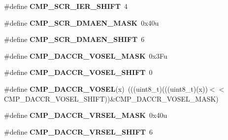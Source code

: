 \begin{DoxyCompactItemize}
\item 
\#define {\bfseries C\+M\+P\+\_\+\+S\+C\+R\+\_\+\+I\+E\+R\+\_\+\+S\+H\+I\+FT}~4\hypertarget{group__CMP__Register__Masks_ga24fc92779af70d4d7fc87102c53b86ca}{}\label{group__CMP__Register__Masks_ga24fc92779af70d4d7fc87102c53b86ca}

\item 
\#define {\bfseries C\+M\+P\+\_\+\+S\+C\+R\+\_\+\+D\+M\+A\+E\+N\+\_\+\+M\+A\+SK}~0x40u\hypertarget{group__CMP__Register__Masks_ga217e649d3512ff1bba2c22885d768148}{}\label{group__CMP__Register__Masks_ga217e649d3512ff1bba2c22885d768148}

\item 
\#define {\bfseries C\+M\+P\+\_\+\+S\+C\+R\+\_\+\+D\+M\+A\+E\+N\+\_\+\+S\+H\+I\+FT}~6\hypertarget{group__CMP__Register__Masks_gafafda406631ad26c72187f4df02df484}{}\label{group__CMP__Register__Masks_gafafda406631ad26c72187f4df02df484}

\item 
\#define {\bfseries C\+M\+P\+\_\+\+D\+A\+C\+C\+R\+\_\+\+V\+O\+S\+E\+L\+\_\+\+M\+A\+SK}~0x3\+Fu\hypertarget{group__CMP__Register__Masks_gaf785bdf33cec5e0e8d03022bd7d92022}{}\label{group__CMP__Register__Masks_gaf785bdf33cec5e0e8d03022bd7d92022}

\item 
\#define {\bfseries C\+M\+P\+\_\+\+D\+A\+C\+C\+R\+\_\+\+V\+O\+S\+E\+L\+\_\+\+S\+H\+I\+FT}~0\hypertarget{group__CMP__Register__Masks_ga329adee42ffc5125d3a6a85c6b990311}{}\label{group__CMP__Register__Masks_ga329adee42ffc5125d3a6a85c6b990311}

\item 
\#define {\bfseries C\+M\+P\+\_\+\+D\+A\+C\+C\+R\+\_\+\+V\+O\+S\+EL}(x)~(((uint8\+\_\+t)(((uint8\+\_\+t)(x))$<$$<$C\+M\+P\+\_\+\+D\+A\+C\+C\+R\+\_\+\+V\+O\+S\+E\+L\+\_\+\+S\+H\+I\+FT))\&C\+M\+P\+\_\+\+D\+A\+C\+C\+R\+\_\+\+V\+O\+S\+E\+L\+\_\+\+M\+A\+SK)\hypertarget{group__CMP__Register__Masks_gaac950bb0c2d158445dd28d3493708637}{}\label{group__CMP__Register__Masks_gaac950bb0c2d158445dd28d3493708637}

\item 
\#define {\bfseries C\+M\+P\+\_\+\+D\+A\+C\+C\+R\+\_\+\+V\+R\+S\+E\+L\+\_\+\+M\+A\+SK}~0x40u\hypertarget{group__CMP__Register__Masks_gac9eceaf5b3e478eb1a332681c8bcf160}{}\label{group__CMP__Register__Masks_gac9eceaf5b3e478eb1a332681c8bcf160}

\item 
\#define {\bfseries C\+M\+P\+\_\+\+D\+A\+C\+C\+R\+\_\+\+V\+R\+S\+E\+L\+\_\+\+S\+H\+I\+FT}~6\hypertarget{group__CMP__Register__Masks_gab9f804a9c4ecafbaaa82f2fc0ec69083}{}\label{group__CMP__Register__Masks_gab9f804a9c4ecafbaaa82f2fc0ec69083}


\end{DoxyCompactItemize}
